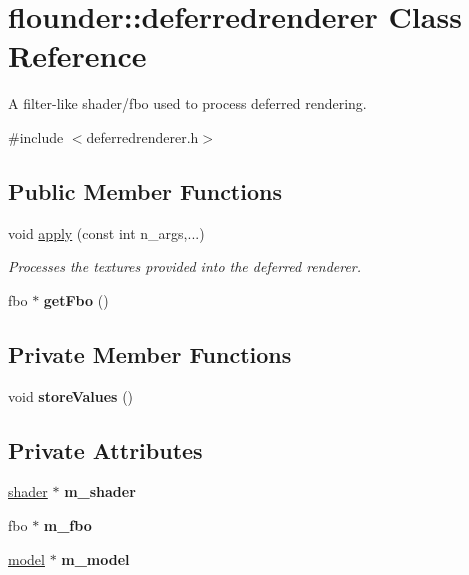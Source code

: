 \hypertarget{classflounder_1_1deferredrenderer}{}\section{flounder\+:\+:deferredrenderer Class Reference}
\label{classflounder_1_1deferredrenderer}


A filter-\/like shader/fbo used to process deferred rendering.  




{\ttfamily \#include $<$deferredrenderer.\+h$>$}

\subsection*{Public Member Functions}
\begin{DoxyCompactItemize}
\item 
void \hyperlink{classflounder_1_1deferredrenderer_af369386b3a61385cd8ec2444662599c3}{apply} (const int n\+\_\+args,...)
\begin{DoxyCompactList}\small\item\em Processes the textures provided into the deferred renderer. \end{DoxyCompactList}\item 
\mbox{\label{classflounder_1_1deferredrenderer_a6a4c0a21d4bf23bf3a499c3a5c100df3}} 
fbo $\ast$ {\bfseries get\+Fbo} ()
\end{DoxyCompactItemize}
\subsection*{Private Member Functions}
\begin{DoxyCompactItemize}
\item 
\mbox{\label{classflounder_1_1deferredrenderer_a4385f75bb3b15be6c91da12851432226}} 
void {\bfseries store\+Values} ()
\end{DoxyCompactItemize}
\subsection*{Private Attributes}
\begin{DoxyCompactItemize}
\item 
\mbox{\label{classflounder_1_1deferredrenderer_aa3b23b38544636f0ac7225fd4a3e6846}} 
\hyperlink{classflounder_1_1shader}{shader} $\ast$ {\bfseries m\+\_\+shader}
\item 
\mbox{\label{classflounder_1_1deferredrenderer_a771f3f5131354fb4dcce1fc1a59957cf}} 
fbo $\ast$ {\bfseries m\+\_\+fbo}
\item 
\mbox{\label{classflounder_1_1deferredrenderer_a4f90f33b5091fc3d1d46d7bb02ce56f8}} 
\hyperlink{classflounder_1_1model}{model} $\ast$ {\bfseries m\+\_\+model}
\end{DoxyCompactItemize}
